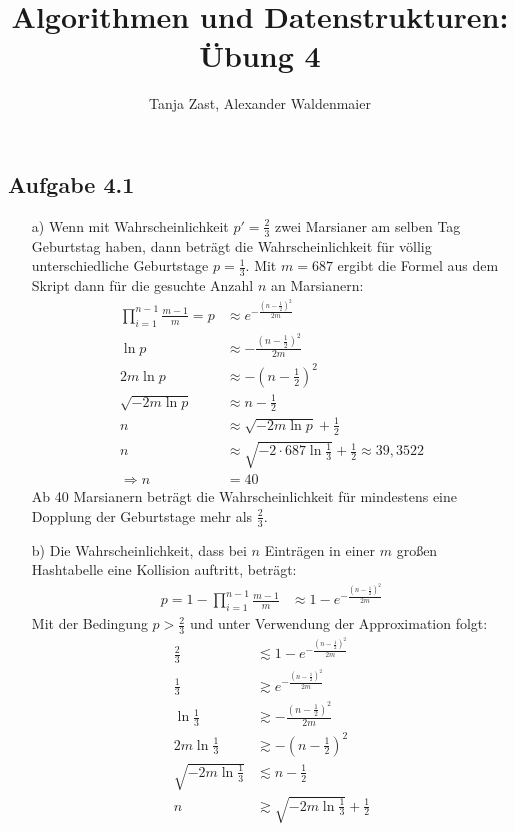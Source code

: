 \documentclass{article}
\title{Algorithmen und Datenstrukturen: Übung 4}
\author{Tanja Zast, Alexander Waldenmaier}
\begin{document}
    \maketitle

    \subsection*{Aufgabe 4.1}
    \begin{enumerate}
        \item[a)] Wenn mit Wahrscheinlichkeit $p'=\frac{2}{3}$ zwei Marsianer am selben Tag Geburtstag haben, dann beträgt die Wahrscheinlichkeit für völlig unterschiedliche Geburtstage $p = \frac{1}{3}$. Mit $m=687$ ergibt die Formel aus dem Skript dann für die gesuchte Anzahl $n$ an Marsianern: 
        \begin{align*}
            \prod_{i=1}^{n-1} \frac{m-1}{m} = p &\approx e^{-\frac{\left(n-\frac{1}{2}\right)^2}{2m}} \\
            \ln p &\approx -\frac{\left(n-\frac{1}{2}\right)^2}{2m} \\
            2m \ln p &\approx -\left(n-\frac{1}{2}\right)^2 \\
            \sqrt{- 2m \ln p} &\approx n - \frac{1}{2} \\
            n &\approx \sqrt{- 2m \ln p} + \frac{1}{2} \\
            n &\approx \sqrt{- 2 \cdot 687 \ln \frac{1}{3}} + \frac{1}{2} \approx 39,3522 \\
            \Rightarrow n &= 40
        \end{align*}
        Ab 40 Marsianern beträgt die Wahrscheinlichkeit für mindestens eine Dopplung der Geburtstage mehr als $\frac{2}{3}$. 
        \item[b)] Die Wahrscheinlichkeit, dass bei $n$ Einträgen in einer $m$ großen Hashtabelle eine Kollision auftritt, beträgt:
        \begin{align*}
            p = 1 - \prod_{i=1}^{n-1} \frac{m-1}{m} &\approx 1- e^{-\frac{\left(n-\frac{1}{2}\right)^2}{2m}}
        \end{align*}
        Mit der Bedingung $p> \frac{2}{3}$ und unter Verwendung der Approximation folgt:
        \begin{align*}
            \frac{2}{3} &\lesssim 1- e^{-\frac{\left(n-\frac{1}{2}\right)^2}{2m}} \\
            \frac{1}{3} &\gtrsim e^{-\frac{\left(n-\frac{1}{2}\right)^2}{2m}} \\
            \ln \frac{1}{3} &\gtrsim -\frac{\left(n-\frac{1}{2}\right)^2}{2m} \\
            2m \ln \frac{1}{3} &\gtrsim -\left(n-\frac{1}{2}\right)^2 \\
            \sqrt{- 2m \ln \frac{1}{3}} &\lesssim n - \frac{1}{2} \\
            n &\gtrsim \sqrt{- 2m \ln \frac{1}{3}} + \frac{1}{2}
        \end{align*}
    \end{enumerate}
\end{document}
